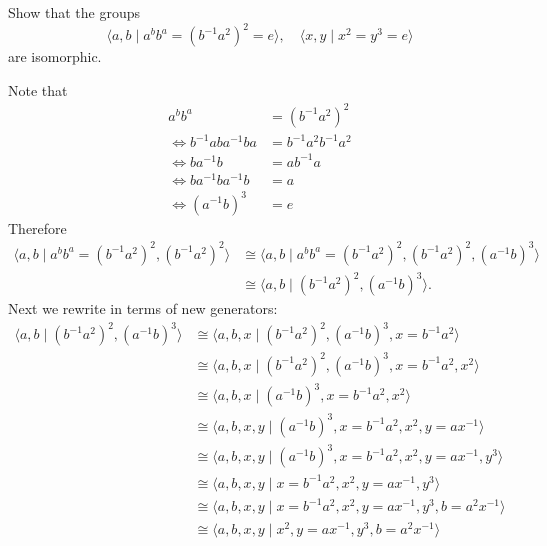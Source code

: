 \begin{questions}
\question Show that the groups
  \[ \langle a,b \mid a^bb^a = (b^{-1}a^2)^2 = e \rangle, \quad \langle x,y \mid x^2 = y^3 = e \rangle \]
  are isomorphic.
  \begin{solution}
    Note that
    \begin{align*}
      a^bb^a &= (b^{-1}a^2)^2 \\
      \iff b^{-1}aba^{-1}ba &= b^{-1}a^2b^{-1}a^2 \\
      \iff ba^{-1}b &= ab^{-1}a \\
      \iff ba^{-1}ba^{-1}b &= a \\
      \iff (a^{-1}b)^3 &= e
    \end{align*}
    Therefore
    \begin{align*}
      \langle a,b \mid a^bb^a = (b^{-1}a^2)^2, (b^{-1}a^2)^2 \rangle &\cong \langle a,b \mid a^bb^a = (b^{-1}a^2)^2, (b^{-1}a^2)^2, (a^{-1}b)^3 \rangle \\
                                                                     &\cong \langle a,b \mid (b^{-1}a^2)^2, (a^{-1}b)^3 \rangle.
    \end{align*}
    Next we rewrite in terms of new generators:
    \begin{align*}
      \langle a,b \mid (b^{-1}a^2)^2, (a^{-1}b)^3 \rangle &\cong \langle a,b,x \mid (b^{-1}a^2)^2, (a^{-1}b)^3, x = b^{-1}a^2 \rangle \\
                                                          &\cong \langle a,b,x \mid (b^{-1}a^2)^2, (a^{-1}b)^3, x = b^{-1}a^2, x^2 \rangle \\
                                                          &\cong \langle a,b,x \mid (a^{-1}b)^3, x=b^{-1}a^2, x^2 \rangle \\
                                                          &\cong \langle a,b,x,y \mid (a^{-1}b)^3, x=b^{-1}a^2, x^2, y=ax^{-1} \rangle \\
                                                          &\cong \langle a,b,x,y \mid (a^{-1}b)^3, x=b^{-1}a^2, x^2, y=ax^{-1}, y^3 \rangle \\
                                                          &\cong \langle a,b,x,y \mid x=b^{-1}a^2, x^2, y=ax^{-1}, y^3 \rangle \\
                                                          &\cong \langle a,b,x,y \mid x=b^{-1}a^2, x^2, y=ax^{-1}, y^3, b=a^2x^{-1} \rangle \\
                                                          &\cong \langle a,b,x,y \mid x^2, y=ax^{-1}, y^3, b=a^2x^{-1} \rangle \\

\end{align*}
\end{solution}
\end{questions}
